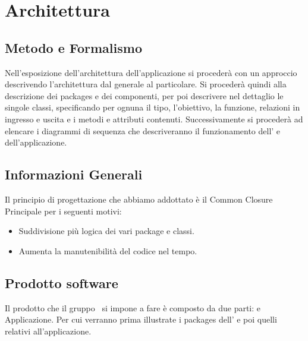 \newpage
\section{Architettura}

\subsection{Metodo e Formalismo}
Nell’esposizione dell’architettura dell’applicazione si procederà con un approccio  descrivendo l’architettura dal generale al particolare. Si procederà quindi alla descrizione dei
packages e dei componenti, per poi descrivere nel dettaglio le singole classi, specificando per
ognuna il tipo, l’obiettivo, la funzione, relazioni in ingresso e uscita e i metodi e attributi contenuti. Successivamente si procederà ad elencare i diagrammi di sequenza che descriveranno il funzionamento dell' e dell'applicazione. 


\subsection{Informazioni Generali}
Il principio di progettazione che abbiamo addottato è il Common Closure Principale per i seguenti motivi:
\begin{itemize}
\item Suddivisione più logica dei vari package e classi.
\item Aumenta la manutenibilità del codice nel tempo.
\end{itemize}

\subsection{Prodotto software}
Il prodotto che il gruppo \gruppo\ si impone a fare è composto da due parti:  e Applicazione. Per cui verranno prima illustrate i packages dell' e poi quelli relativi all'applicazione.






\newpage